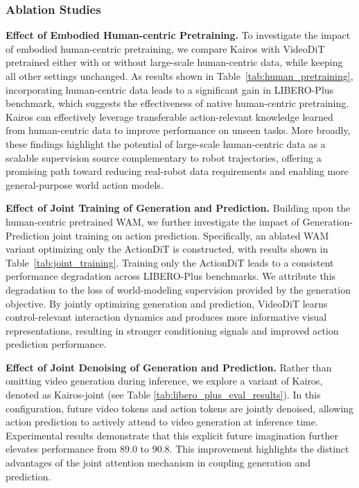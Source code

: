 \subsubsection{Ablation Studies} 

\textbf{Effect of Embodied Human-centric Pretraining.} To investigate the impact of embodied human-centric pretraining, we compare Kairos with VideoDiT pretrained either with or without large-scale human-centric data, while keeping all other settings unchanged. As results shown in Table~\ref{tab:human_pretraining}, incorporating human-centric data leads to a significant gain in LIBERO-Plus benchmark, which suggests the effectiveness of native human-centric pretraining. Kairos can effectively leverage transferable action-relevant knowledge learned from human-centric data to improve performance on unseen tasks. More broadly, these findings highlight the potential of large-scale human-centric data as a scalable supervision source complementary to robot trajectories, offering a promising path toward reducing real-robot data requirements and enabling more general-purpose world action models.


\textbf{Effect of Joint Training of Generation and Prediction.} Building upon the human-centric pretrained WAM, we further investigate the impact of Generation-Prediction joint training on action prediction. Specifically, an ablated WAM variant optimizing only the ActionDiT is constructed, with results shown in Table~\ref{tab:joint_training}. Training only the ActionDiT leads to a consistent performance degradation across LIBERO-Plus benchmarks. We attribute this degradation to the loss of world-modeling supervision provided by the generation objective. By jointly optimizing generation and prediction, VideoDiT learns control-relevant interaction dynamics and produces more informative visual representations, resulting in stronger conditioning signals and improved action prediction performance.

\textbf{Effect of Joint Denoising of Generation and Prediction.} 
Rather than omitting video generation during inference, we explore a variant of Kairos, denoted as Kairos-joint (see Table \ref{tab:libero_plus_eval_results}). In this configuration, future video tokens and action tokens are jointly denoised, allowing action prediction to actively attend to video generation at inference time. Experimental results demonstrate that this explicit future imagination further elevates performance from 89.0 to 90.8. This improvement highlights the distinct advantages of the joint attention mechanism in coupling generation and prediction.



